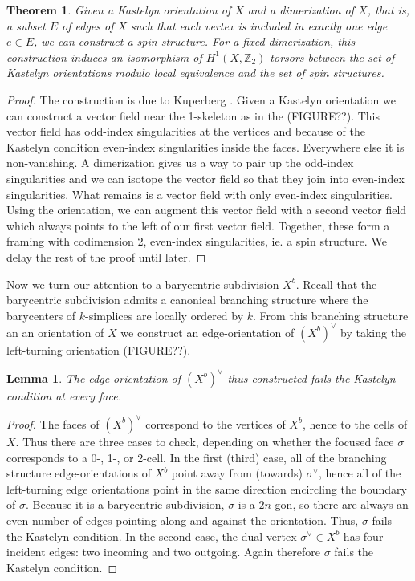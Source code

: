 \documentclass{article}
\def\bZ{\mathbb{Z}}
\newtheorem{thm}{Theorem}
\newtheorem{lemma}{Lemma}
\theoremstyle{definition}
\begin{document}
\begin{thm}
Given a Kastelyn orientation of $X$ and a dimerization of $X$, that is, a subset $E$ of edges of $X$ such that each vertex is included in exactly one edge $e \in E$, we can construct a spin structure. For a fixed dimerization, this construction induces an isomorphism of $H^1(X,\bZ_2)$-torsors between the set of Kastelyn orientations modulo local equivalence and the set of spin structures.
\end{thm}


\begin{proof}

The construction is due to Kuperberg \cite{}. Given a Kastelyn orientation we can construct a vector field near the 1-skeleton as in the (FIGURE??). This vector field has odd-index singularities at the vertices and because of the Kastelyn condition even-index singularities inside the faces. Everywhere else it is non-vanishing. A dimerization gives us a way to pair up the odd-index singularities and we can isotope the vector field so that they join into even-index singularities. What remains is a vector field with only even-index singularities. Using the orientation, we can augment this vector field with a second vector field which always points to the left of our first vector field. Together, these form a framing with codimension 2, even-index singularities, ie. a spin structure. We delay the rest of the proof until later.

\end{proof}

Now we turn our attention to a barycentric subdivision $X^b$. Recall that the barycentric subdivision admits a canonical branching structure where the barycenters of $k$-simplices are locally ordered by $k$. From this branching structure an an orientation of $X$ we construct an edge-orientation of $(X^b)^\vee$ by taking the left-turning orientation (FIGURE??).

\begin{lemma}
The edge-orientation of $(X^b)^\vee$ thus constructed fails the Kastelyn condition at every face.
\end{lemma}


\begin{proof}

The faces of $(X^b)^\vee$ correspond to the vertices of $X^b$, hence to the cells of $X$. Thus there are three cases to check, depending on whether the focused face $\sigma$ corresponds to a 0-, 1-, or 2-cell. In the first (third) case, all of the branching structure edge-orientations of $X^b$ point away from (towards) $\sigma^\vee$, hence all of the left-turning edge orientations point in the same direction encircling the boundary of $\sigma$. Because it is a barycentric subdivision, $\sigma$ is a $2n$-gon, so there are always an even number of edges pointing along and against the orientation. Thus, $\sigma$ fails the Kastelyn condition. In the second case, the dual vertex $\sigma^\vee \in X^b$ has four incident edges: two incoming and two outgoing. Again therefore $\sigma$ fails the Kastelyn condition.

\end{proof}
\end{document}
